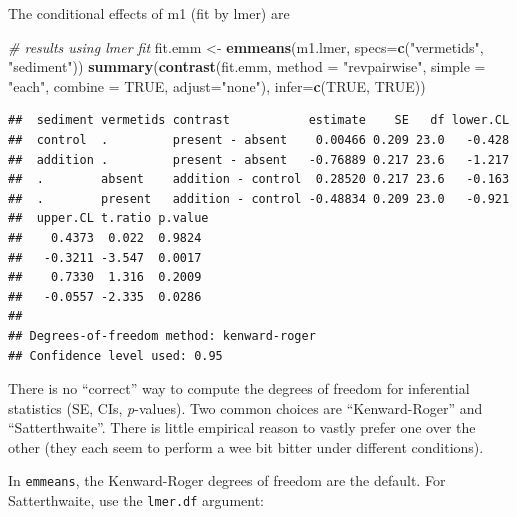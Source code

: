 \documentclass[]{book}
\newenvironment{Shaded}{\begin{snugshade}}{\end{snugshade}}
\newcommand{\KeywordTok}[1]{\textcolor[rgb]{0.13,0.29,0.53}{\textbf{#1}}}
\newcommand{\DataTypeTok}[1]{\textcolor[rgb]{0.13,0.29,0.53}{#1}}
\newcommand{\StringTok}[1]{\textcolor[rgb]{0.31,0.60,0.02}{#1}}
\newcommand{\CommentTok}[1]{\textcolor[rgb]{0.56,0.35,0.01}{\textit{#1}}}
\newcommand{\OtherTok}[1]{\textcolor[rgb]{0.56,0.35,0.01}{#1}}
\newcommand{\NormalTok}[1]{#1}
\begin{document}
The conditional effects of m1 (fit by lmer) are

\begin{Shaded}
\begin{Highlighting}[]
\CommentTok{# results using lmer fit}
\NormalTok{fit.emm <-}\StringTok{ }\KeywordTok{emmeans}\NormalTok{(m1.lmer, }\DataTypeTok{specs=}\KeywordTok{c}\NormalTok{(}\StringTok{"vermetids"}\NormalTok{, }\StringTok{"sediment"}\NormalTok{))}
\KeywordTok{summary}\NormalTok{(}\KeywordTok{contrast}\NormalTok{(fit.emm, }
                 \DataTypeTok{method =} \StringTok{"revpairwise"}\NormalTok{, }
                 \DataTypeTok{simple =} \StringTok{"each"}\NormalTok{,}
                 \DataTypeTok{combine =} \OtherTok{TRUE}\NormalTok{,}
                 \DataTypeTok{adjust=}\StringTok{"none"}\NormalTok{),}
        \DataTypeTok{infer=}\KeywordTok{c}\NormalTok{(}\OtherTok{TRUE}\NormalTok{, }\OtherTok{TRUE}\NormalTok{))}
\end{Highlighting}
\end{Shaded}

\begin{verbatim}
##  sediment vermetids contrast           estimate    SE   df lower.CL
##  control  .         present - absent    0.00466 0.209 23.0   -0.428
##  addition .         present - absent   -0.76889 0.217 23.6   -1.217
##  .        absent    addition - control  0.28520 0.217 23.6   -0.163
##  .        present   addition - control -0.48834 0.209 23.0   -0.921
##  upper.CL t.ratio p.value
##    0.4373  0.022  0.9824 
##   -0.3211 -3.547  0.0017 
##    0.7330  1.316  0.2009 
##   -0.0557 -2.335  0.0286 
## 
## Degrees-of-freedom method: kenward-roger 
## Confidence level used: 0.95
\end{verbatim}

There is no ``correct'' way to compute the degrees of freedom for
inferential statistics (SE, CIs, \emph{p}-values). Two common choices
are ``Kenward-Roger'' and ``Satterthwaite''. There is little empirical
reason to vastly prefer one over the other (they each seem to perform a
wee bit bitter under different conditions).

In \texttt{emmeans}, the Kenward-Roger degrees of freedom are the
default. For Satterthwaite, use the \texttt{lmer.df} argument:
\end{document}
